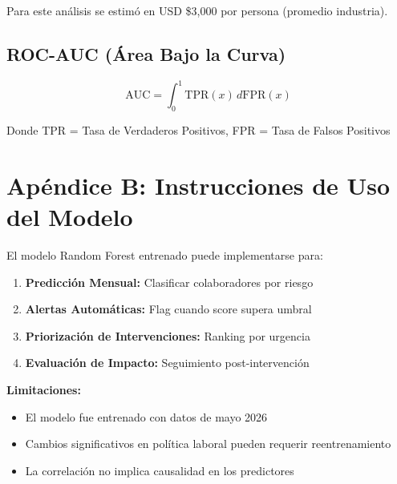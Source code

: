 \documentclass[11pt,a4paper,twoside]{article}
\begin{document}
Para este análisis se estimó en USD \$3,000 por persona (promedio industria).

\subsection*{ROC-AUC (Área Bajo la Curva)}
\[
\text{AUC} = \int_{0}^{1} \text{TPR}(x) \, d\text{FPR}(x)
\]

Donde TPR = Tasa de Verdaderos Positivos, FPR = Tasa de Falsos Positivos

\newpage
\section*{Apéndice B: Instrucciones de Uso del Modelo}

El modelo Random Forest entrenado puede implementarse para:

\begin{enumerate}
    \item \textbf{Predicción Mensual:} Clasificar colaboradores por riesgo
    \item \textbf{Alertas Automáticas:} Flag cuando score supera umbral
    \item \textbf{Priorización de Intervenciones:} Ranking por urgencia
    \item \textbf{Evaluación de Impacto:} Seguimiento post-intervención
\end{enumerate}

\textbf{Limitaciones:}
\begin{itemize}
    \item El modelo fue entrenado con datos de mayo 2026
    \item Cambios significativos en política laboral pueden requerir reentrenamiento
    \item La correlación no implica causalidad en los predictores
\end{itemize}
\end{document}
